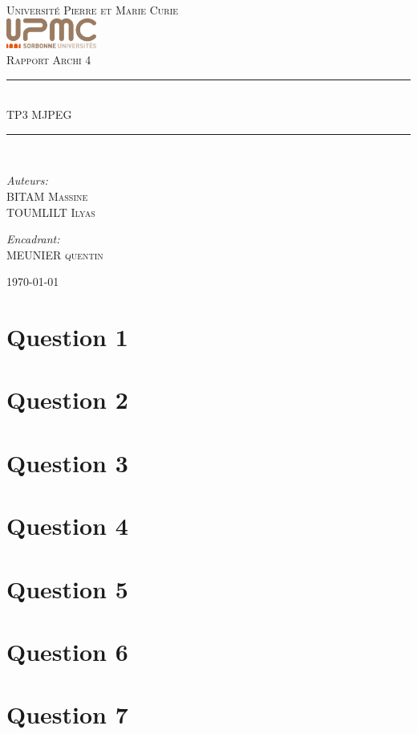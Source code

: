 \documentclass[12pt]{article}
\newcommand{\HRule}{\rule{\linewidth}{0.5mm}}
\begin{document}
\begin{titlepage}
  \begin{center}
    \textsc{\LARGE Université Pierre et Marie Curie}\\[1.5cm]
    \includegraphics[height=1cm]{upmc.png}\\[1.5cm]
    \textsc{\Large Rapport Archi 4 }\\[2cm]
    \HRule \\[1cm]
    \textsc{\huge TP3 MJPEG }\\[0.5cm]
    \HRule \\[1cm]
    \noindent
    \begin{minipage}[t]{0.55\textwidth}
      \begin{flushleft} \large
        \emph{Auteurs:}\\
        BITAM \textsc{Massine}\\
        TOUMLILT \textsc{Ilyas}
      \end{flushleft}
    \end{minipage}%
    \begin{minipage}[t]{0.47\textwidth}
      \begin{flushright} \large
        \emph{Encadrant:} \\
        MEUNIER \textsc{quentin}
      \end{flushright}
    \end{minipage}
    \vfill
    {\large \today}
  \end{center}
\end{titlepage}

\section*{Question 1}

\section*{Question 2}
\section*{Question 3}
\section*{Question 4}

\section*{Question 5}

\section*{Question 6}

\section*{Question 7}
\end{document}
